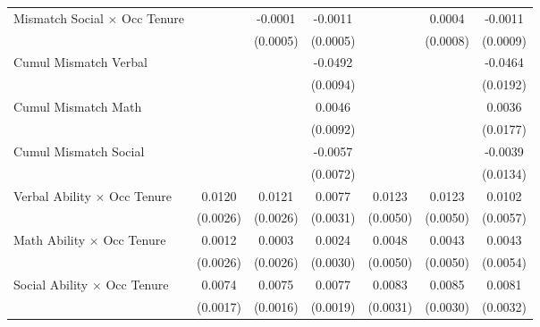 {\begin{longtable}{l*{6}{c}}
Mismatch Social $\times$ Occ Tenure&                     &     -0.0001         &     -0.0011\sym{*}  &                     &      0.0004         &     -0.0011         \\
                    &                     &    (0.0005)         &    (0.0005)         &                     &    (0.0008)         &    (0.0009)         \\
Cumul Mismatch Verbal&                     &                     &     -0.0492\sym{***}&                     &                     &     -0.0464\sym{**} \\
                    &                     &                     &    (0.0094)         &                     &                     &    (0.0192)         \\
Cumul Mismatch Math &                     &                     &      0.0046         &                     &                     &      0.0036         \\
                    &                     &                     &    (0.0092)         &                     &                     &    (0.0177)         \\
Cumul Mismatch Social&                     &                     &     -0.0057         &                     &                     &     -0.0039         \\
                    &                     &                     &    (0.0072)         &                     &                     &    (0.0134)         \\
Verbal Ability $\times$ Occ Tenure&      0.0120\sym{***}&      0.0121\sym{***}&      0.0077\sym{**} &      0.0123\sym{**} &      0.0123\sym{**} &      0.0102\sym{*}  \\
                    &    (0.0026)         &    (0.0026)         &    (0.0031)         &    (0.0050)         &    (0.0050)         &    (0.0057)         \\
Math Ability $\times$ Occ Tenure&      0.0012         &      0.0003         &      0.0024         &      0.0048         &      0.0043         &      0.0043         \\
                    &    (0.0026)         &    (0.0026)         &    (0.0030)         &    (0.0050)         &    (0.0050)         &    (0.0054)         \\
Social Ability $\times$ Occ Tenure&      0.0074\sym{***}&      0.0075\sym{***}&      0.0077\sym{***}&      0.0083\sym{***}&      0.0085\sym{***}&      0.0081\sym{**} \\
                    &    (0.0017)         &    (0.0016)         &    (0.0019)         &    (0.0031)         &    (0.0030)         &    (0.0032)         \\

\end{longtable}}
